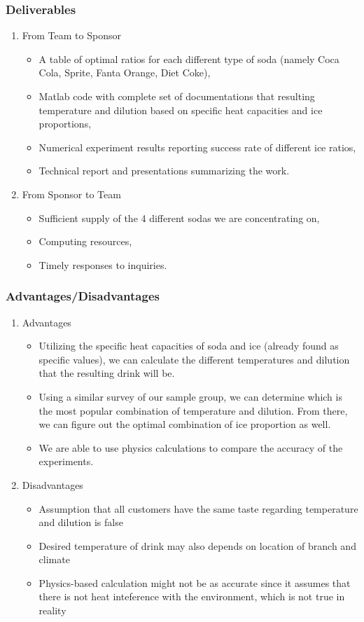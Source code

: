 \documentclass[compress,handout,10pt]{beamer}
\let\olditem\item
\renewcommand{\item}{\setlength{\itemsep}{0.5\baselineskip}\olditem}
\begin{document}
\begin{frame}
    \frametitle{Deliverables}
\begin{enumerate}
 \item From Team to Sponsor
\begin{itemize}
    \item A table of optimal ratios for each different type of soda (namely Coca Cola, Sprite, Fanta Orange, Diet Coke),
    \item Matlab code with complete set of documentations that resulting temperature and dilution based on specific heat capacities and ice proportions,
    \item Numerical experiment results reporting success rate of different ice ratios,
    \item Technical report and presentations summarizing the work. 
\end{itemize}

\item From Sponsor to Team
\begin{itemize}
    \item Sufficient supply of the 4 different sodas we are concentrating on,
    \item Computing resources,
    \item Timely responses to inquiries.
\end{itemize}
\end{enumerate}
\end{frame}


\begin{frame}
    \frametitle{Advantages/Disadvantages}
\begin{enumerate}
\item Advantages
\begin {itemize}
\item Utilizing the specific heat capacities of soda and ice (already found as specific values), we can calculate the different temperatures and dilution that the resulting drink will be.
\item Using a similar survey of our sample group, we can determine which is the most popular combination of temperature and dilution. From there, we can figure out the optimal combination of ice proportion as well.
\item We are able to use physics calculations to compare the accuracy of the experiments.
\end{itemize}
\item Disadvantages
\begin{itemize}
\item Assumption that all customers have the same taste regarding temperature and dilution is false
\item Desired temperature of drink may also depends on location of branch and climate
\item Physics-based calculation might not be as accurate since it assumes that there is not heat inteference with the environment, which is not true in reality
\end{itemize}
\end{enumerate}
\end{frame}
\end{document}
